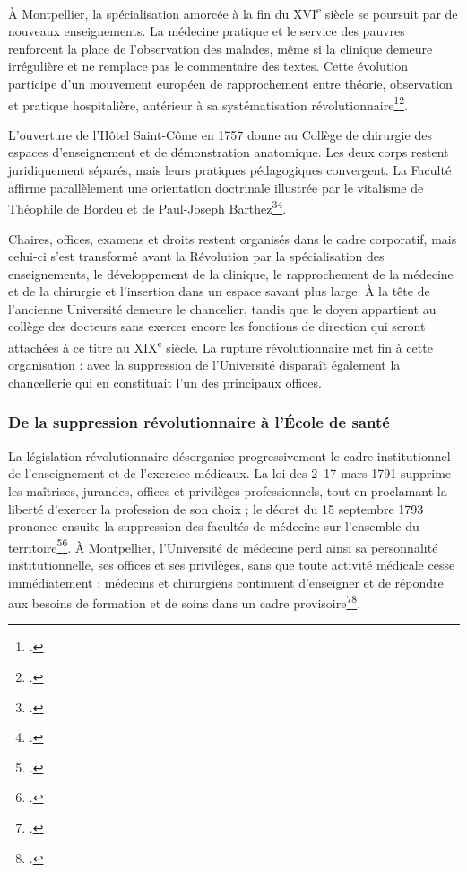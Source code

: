 À Montpellier, la spécialisation amorcée à la fin du XVI\textsuperscript{e} siècle se poursuit par de nouveaux enseignements. La médecine pratique et le service des pauvres renforcent la place de l'observation des malades, même si la clinique demeure irrégulière et ne remplace pas le commentaire des textes. Cette évolution participe d'un mouvement européen de rapprochement entre théorie, observation et pratique hospitalière, antérieur à sa systématisation révolutionnaire\footcite{Brockliss1989EnseignementMedical}\footcite{Dulieu1955VieMedicale}.

L'ouverture de l'Hôtel Saint-Côme en 1757 donne au Collège de chirurgie des espaces d'enseignement et de démonstration anatomique. Les deux corps restent juridiquement séparés, mais leurs pratiques pédagogiques convergent. La Faculté affirme parallèlement une orientation doctrinale illustrée par le vitalisme de Théophile de Bordeu et de Paul-Joseph Barthez\footcite{LavabreBertrand2021Esprit}\footcite{Dulieu1971Barthez}.

Chaires, offices, examens et droits restent organisés dans le cadre corporatif, mais celui-ci s'est transformé avant la Révolution par la spécialisation des enseignements, le développement de la clinique, le rapprochement de la médecine et de la chirurgie et l'insertion dans un espace savant plus large. À la tête de l'ancienne Université demeure le chancelier, tandis que le doyen appartient au collège des docteurs sans exercer encore les fonctions de direction qui seront attachées à ce titre au XIX\textsuperscript{e} siècle. La rupture révolutionnaire met fin à cette organisation : avec la suppression de l'Université disparaît également la chancellerie qui en constituait l'un des principaux offices.

\subsubsection{De la suppression révolutionnaire à l'École de santé}

La législation révolutionnaire désorganise progressivement le cadre institutionnel de l'enseignement et de l'exercice médicaux. La loi des 2--17 mars 1791 supprime les maîtrises, jurandes, offices et privilèges professionnels, tout en proclamant la liberté d'exercer la profession de son choix ; le décret du 15 septembre 1793 prononce ensuite la suppression des facultés de médecine sur l'ensemble du territoire\footcite[art.~2 et 7]{LoiAllarde1791}\footcite[art.~3]{DecretFacultes1793}. À Montpellier, l'Université de médecine perd ainsi sa personnalité institutionnelle, ses offices et ses privilèges, sans que toute activité médicale cesse immédiatement : médecins et chirurgiens continuent d'enseigner et de répondre aux besoins de formation et de soins dans un cadre provisoire\footcite{Dulieu1955VieMedicale}\footcite{HuardImbaultHuart1973}.

